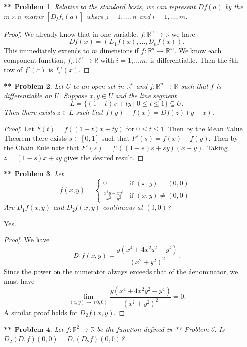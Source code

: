 \documentclass{article}
\newtheorem{**}{** Problem}
\begin{document}
\begin{flushleft}
\begin{**}
Relative to the standard basis, we can represent $Df(a)$ by the $m \times n$ matrix $[D_j f_i (a)]$ where $j = 1, \dots , n$ and $i = 1, \dots , m$.
\end{**}
\begin{proof}
We already know that in one variable, $f : \mathbb{R}^n \rightarrow \mathbb{R}$ we have
\[
Df(x) = (D_1 f(x), \dots , D_n f(x)).
\]
This immediately extends to $m$ dimensions if $f : \mathbb{R}^n \rightarrow \mathbb{R}^m$. We know each component function, $f_i : \mathbb{R}^n \rightarrow \mathbb{R}$ with $i = 1, \dots m$, is differentiable. Then the $i$th row of $f'(x)$ is $f_i'(x)$.
\end{proof}

\begin{**}
Let $U$ be an open set in $\mathbb{R}^n$ and $f : \mathbb{R}^n \rightarrow \mathbb{R}$ such that $f$ is differentiable on $U$. Suppose $x,y \in U$ and the line segment
\[
L = \{(1-t)x + ty \mid 0 \leq t \leq 1\} \subseteq U.
\]
Then there exists $z \in L$ such that $f(y) - f(x) = Df(z) (y-x)$.
\end{**}
\begin{proof}
Let $F(t) = f((1-t)x + ty)$ for $0 \leq t \leq 1$. Then by the Mean Value Theorem there exists $s \in [0,1]$ such that $F'(s) = f(x) - f(y)$. Then by the Chain Rule note that $F'(s) = f'((1-s)x + sy) (x-y)$. Taking $z = (1-s)x + sy$ gives the desired result.
\end{proof}

\begin{**}
Let
\[
f(x,y) =
\begin{cases}
0 & \text{if $(x,y) = (0,0)$}\\
\frac{x^3y + xy^3}{x^2 + y^2} & \text{if $(x,y) \neq (0,0)$}.
\end{cases}
\]
Are $D_1 f(x,y)$ and $D_2 f(x,y)$ continuous at $(0,0)$?
\end{**}

Yes.
\begin{proof}
We have
\[
D_1f(x,y) = \frac{y(x^4 + 4x^2y^2-y^4)}{(x^2 + y^2)^2}.
\]
Since the power on the numerator always exceeds that of the denominator, we must have
\[
\lim_{(x,y) \rightarrow (0,0)} \frac{y(x^4 + 4x^2y^2-y^4)}{(x^2 + y^2)^2} = 0.
\]
A similar proof holds for $D_2f(x,y)$.
\end{proof}

\begin{**}
Let $f : \mathbb{R}^2 \rightarrow \mathbb{R}$ be the function defined in ** Problem 5. Is $D_2(D_1f)(0,0) = D_1(D_2f)(0,0)$?
\end{**}


\end{flushleft}
\end{document}

